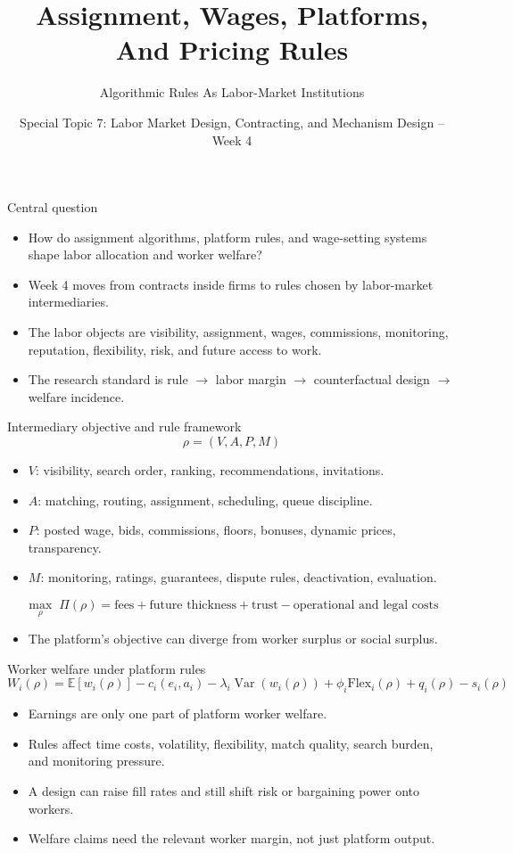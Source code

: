 \documentclass[aspectratio=169,11pt]{beamer}
\title{Assignment, Wages, Platforms, And Pricing Rules}
\subtitle{Algorithmic Rules As Labor-Market Institutions}
\author{Special Topic 7: Labor Market Design, Contracting, and Mechanism Design -- Week 4}
\date{}
\begin{document}
\begin{frame}
  \titlepage
\end{frame}

\begin{frame}{Central question}
\begin{itemize}
    \item How do assignment algorithms, platform rules, and wage-setting systems shape labor allocation and worker welfare?
    \item Week 4 moves from contracts inside firms to rules chosen by labor-market intermediaries.
    \item The labor objects are visibility, assignment, wages, commissions, monitoring, reputation, flexibility, risk, and future access to work.
    \item The research standard is rule $\rightarrow$ labor margin $\rightarrow$ counterfactual design $\rightarrow$ welfare incidence.
\end{itemize}
\end{frame}

\begin{frame}{Intermediary objective and rule framework}
\small
\[
  \rho = (V, A, P, M)
\]
\begin{itemize}
    \item $V$: visibility, search order, ranking, recommendations, invitations.
    \item $A$: matching, routing, assignment, scheduling, queue discipline.
    \item $P$: posted wage, bids, commissions, floors, bonuses, dynamic prices, transparency.
    \item $M$: monitoring, ratings, guarantees, dispute rules, deactivation, evaluation.
\end{itemize}
\[
  \max_{\rho} \; \Pi(\rho)
  = \text{fees} + \text{future thickness} + \text{trust}
  - \text{operational and legal costs}
\]
\begin{itemize}
    \item The platform's objective can diverge from worker surplus or social surplus.
\end{itemize}
\end{frame}

\begin{frame}{Worker welfare under platform rules}
\small
\[
W_i(\rho)=
\mathbb{E}[w_i(\rho)]
- c_i(e_i,a_i)
- \lambda_i \operatorname{Var}(w_i(\rho))
+ \phi_i \text{Flex}_i(\rho)
+ q_i(\rho)
- s_i(\rho)
\]
\begin{itemize}
    \item Earnings are only one part of platform worker welfare.
    \item Rules affect time costs, volatility, flexibility, match quality, search burden, and monitoring pressure.
    \item A design can raise fill rates and still shift risk or bargaining power onto workers.
    \item Welfare claims need the relevant worker margin, not just platform output.
\end{itemize}
\end{frame}
\end{document}
